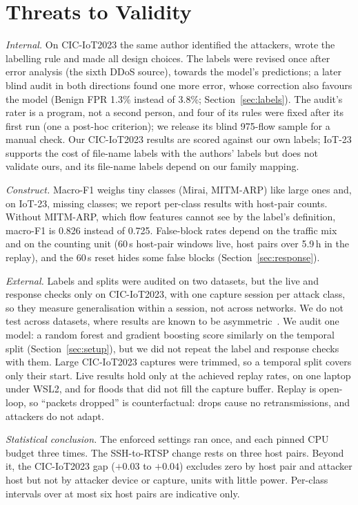 \section{Threats to Validity}\label{sec:threats}

\emph{Internal.} On CIC-IoT2023 the same author identified the attackers, wrote the labelling rule and made all design choices. The labels were revised once after error analysis (the sixth DDoS source), towards the model's predictions; a later blind audit in both directions found one more error, whose correction also favours the model (Benign FPR 1.3\% instead of 3.8\%; Section~\ref{sec:labels}). The audit's rater is a program, not a second person, and four of its rules were fixed after its first run (one a post-hoc criterion); we release its blind 975-flow sample for a manual check. Our CIC-IoT2023 results are scored against our own labels; IoT-23 supports the cost of file-name labels with the authors' labels but does not validate ours, and its file-name labels depend on our family mapping.

\emph{Construct.} Macro-F1 weighs tiny classes (Mirai, MITM-ARP) like large ones and, on IoT-23, missing classes; we report per-class results with host-pair counts. Without MITM-ARP, which flow features cannot see by the label's definition, macro-F1 is 0.826 instead of 0.725. False-block rates depend on the traffic mix and on the counting unit (60\,s host-pair windows live, host pairs over 5.9\,h in the replay), and the 60\,s reset hides some false blocks (Section~\ref{sec:response}).

\emph{External.} Labels and splits were audited on two datasets, but the live and response checks only on CIC-IoT2023, with one capture session per attack class, so they measure generalisation within a session, not across networks. We do not test across datasets, where results are known to be asymmetric~\cite{ali2026siamxbert}. We audit one model: a random forest and gradient boosting score similarly on the temporal split (Section~\ref{sec:setup}), but we did not repeat the label and response checks with them. Large CIC-IoT2023 captures were trimmed, so a temporal split covers only their start. Live results hold only at the achieved replay rates, on one laptop under WSL2, and for floods that did not fill the capture buffer. Replay is open-loop, so ``packets dropped'' is counterfactual: drops cause no retransmissions, and attackers do not adapt.

\emph{Statistical conclusion.} The enforced settings ran once, and each pinned CPU budget three times. The SSH-to-RTSP change rests on three host pairs. Beyond it, the CIC-IoT2023 gap ($+0.03$ to $+0.04$) excludes zero by host pair and attacker host but not by attacker device or capture, units with little power. Per-class intervals over at most six host pairs are indicative only.

